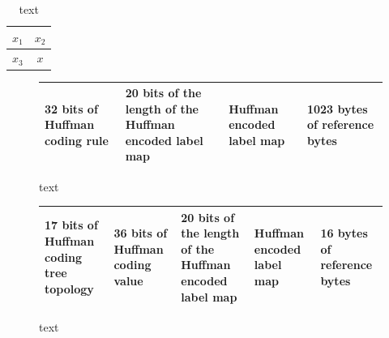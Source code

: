 \begin{table}
	\caption{text}
	\centering
	\begin{tabular}{|c | c |}
		\hline 
		$x_1$ & $x_2$ \\
		\hline 
		$x_3$ & $x$   \\
		\hline 
	\end{tabular}
\end{table}








\begin{figure}
	\centering
	\begin{tabular}{|p{} | p{} |p{} | p{} |}
		\hline 
		32 bits of Huffman coding rule & 20 bits of the length of the Huffman encoded label map & Huffman encoded label map & 1023 bytes of reference bytes \\ 
		\hline
	\end{tabular}
	\caption{text}
\end{figure}

\begin{figure}
	\centering
	\begin{tabular}{|p{} | p{} |p{} | p{}| p{} |}
		\hline 
		17 bits of Huffman coding tree topology & 36 bits of Huffman coding value & 20 bits of the length of the Huffman encoded label map & Huffman encoded label map & 16 bytes of reference bytes \\ 
		\hline
	\end{tabular}
	\caption{text}
\end{figure}





